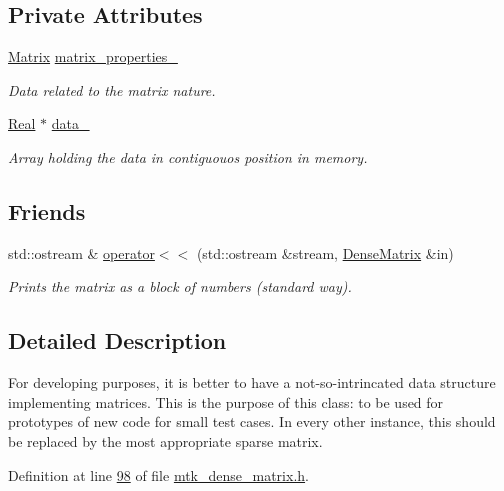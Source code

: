 \subsection*{Private Attributes}
\begin{DoxyCompactItemize}
\item 
\hyperlink{classmtk_1_1Matrix}{Matrix} \hyperlink{classmtk_1_1DenseMatrix_a481c8d09af685a5ba67acefdcaa810cc}{matrix\-\_\-properties\-\_\-}
\begin{DoxyCompactList}\small\item\em Data related to the matrix nature. \end{DoxyCompactList}\item 
\hyperlink{group__c01-roots_gac080bbbf5cbb5502c9f00405f894857d}{Real} $\ast$ \hyperlink{classmtk_1_1DenseMatrix_a7893e4e5c8d2e2de32b156177e78cb6f}{data\-\_\-}
\begin{DoxyCompactList}\small\item\em Array holding the data in contiguouos position in memory. \end{DoxyCompactList}\end{DoxyCompactItemize}
\subsection*{Friends}
\begin{DoxyCompactItemize}
\item 
std\-::ostream \& \hyperlink{classmtk_1_1DenseMatrix_adbcc850ef373550f634f563573a31d28}{operator$<$$<$} (std\-::ostream \&stream, \hyperlink{classmtk_1_1DenseMatrix}{Dense\-Matrix} \&in)
\begin{DoxyCompactList}\small\item\em Prints the matrix as a block of numbers (standard way). \end{DoxyCompactList}\end{DoxyCompactItemize}


\subsection{Detailed Description}
For developing purposes, it is better to have a not-\/so-\/intrincated data structure implementing matrices. This is the purpose of this class\-: to be used for prototypes of new code for small test cases. In every other instance, this should be replaced by the most appropriate sparse matrix. 

Definition at line \hyperlink{mtk__dense__matrix_8h_source_l00098}{98} of file \hyperlink{mtk__dense__matrix_8h_source}{mtk\-\_\-dense\-\_\-matrix.\-h}.



